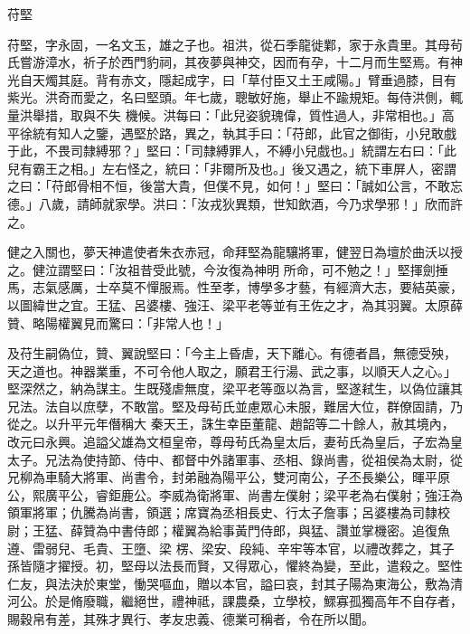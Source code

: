 
\begin{pinyinscope}
苻堅



 苻堅，字永固，一名文玉，雄之子也。祖洪，從石季龍徙鄴，家于永貴里。其母茍氏嘗游漳水，祈子於西門豹祠，其夜夢與神交，因而有孕，十二月而生堅焉。有神光自天燭其庭。背有赤文，隱起成字，曰「草付臣又土王咸陽。」臂垂過膝，目有紫光。洪奇而愛之，名曰堅頭。年七歲，聰敏好施，舉止不踰規矩。每侍洪側，輒量洪舉措，取與不失
 機候。洪每曰：「此兒姿貌瑰偉，質性過人，非常相也。」高平徐統有知人之鑒，遇堅於路，異之，執其手曰：「苻郎，此官之御街，小兒敢戲于此，不畏司隸縛邪？」堅曰：「司隸縛罪人，不縛小兒戲也。」統謂左右曰：「此兒有霸王之相。」左右怪之，統曰：「非爾所及也。」後又遇之，統下車屏人，密謂之曰：「苻郎骨相不恒，後當大貴，但僕不見，如何！」堅曰：「誠如公言，不敢忘德。」八歲，請師就家學。洪曰：「汝戎狄異類，世知飲酒，今乃求學邪！」欣而許之。



 健之入關也，夢天神遣使者朱衣赤冠，命拜堅為龍驤將軍，健翌日為壇於曲沃以授之。健泣謂堅曰：「汝祖昔受此號，今汝復為神明
 所命，可不勉之！」堅揮劍捶馬，志氣感厲，士卒莫不憚服焉。性至孝，博學多才藝，有經濟大志，要結英豪，以圖緯世之宜。王猛、呂婆樓、強汪、梁平老等並有王佐之才，為其羽翼。太原薛贊、略陽權翼見而驚曰：「非常人也！」



 及苻生嗣偽位，贊、翼說堅曰：「今主上昏虐，天下離心。有德者昌，無德受殃，天之道也。神器業重，不可令他人取之，願君王行湯、武之事，以順天人之心。」堅深然之，納為謀主。生既殘虐無度，梁平老等亟以為言，堅遂弒生，以偽位讓其兄法。法自以庶孽，不敢當。堅及母茍氏並慮眾心未服，難居大位，群僚固請，乃從之。以升平元年僭稱大
 秦天王，誅生幸臣董龍、趙韶等二十餘人，赦其境內，改元曰永興。追謚父雄為文桓皇帝，尊母茍氏為皇太后，妻茍氏為皇后，子宏為皇太子。兄法為使持節、侍中、都督中外諸軍事、丞相、錄尚書，從祖侯為太尉，從兄柳為車騎大將軍、尚書令，封弟融為陽平公，雙河南公，子丕長樂公，暉平原公，熙廣平公，睿鉅鹿公。李威為衛將軍、尚書左僕射；梁平老為右僕射；強汪為領軍將軍；仇騰為尚書，領選；席寶為丞相長史、行太子詹事；呂婆樓為司隸校尉；王猛、薛贊為中書侍郎；權翼為給事黃門侍郎，與猛、讚並掌機密。追復魚遵、雷弱兒、毛貴、王墮、梁
 楞、梁安、段純、辛牢等本官，以禮改葬之，其子孫皆隨才擢授。初，堅母以法長而賢，又得眾心，懼終為變，至此，遣殺之。堅性仁友，與法決於東堂，慟哭嘔血，贈以本官，謚曰哀，封其子陽為東海公，敷為清河公。於是脩廢職，繼絕世，禮神祗，課農桑，立學校，鰥寡孤獨高年不自存者，賜穀帛有差，其殊才異行、孝友忠義、德業可稱者，令在所以聞。




\end{pinyinscope}
